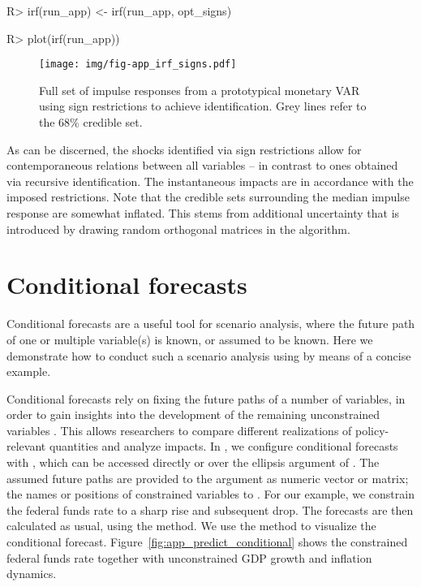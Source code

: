 \documentclass[article,nojss]{jss} %
\begin{document}
\begin{appendix}
\begin{Schunk}
\begin{Sinput}
R> irf(run_app) <- irf(run_app, opt_signs)
\end{Sinput}
\end{Schunk}
\begin{Schunk}
\begin{Sinput}
R> plot(irf(run_app))
\end{Sinput}
\end{Schunk}

\begin{figure}[ht!]
	\centering
  \texttt{[image: img/fig-app\_irf\_signs.pdf]}
	\caption{Full set of impulse responses from a prototypical monetary VAR using sign restrictions to achieve identification. Grey lines refer to the 68\% credible set.}
	\label{fig:app_irf_signs}
\end{figure}

As can be discerned, the shocks identified via sign restrictions allow for contemporaneous relations between all variables -- in contrast to ones obtained via recursive identification.
The instantaneous impacts are in accordance with the imposed restrictions. Note that the credible sets surrounding the median impulse response are somewhat inflated. This stems from additional uncertainty that is introduced by drawing random orthogonal matrices in the algorithm.


\section{Conditional forecasts}\label{app:cond}

Conditional forecasts are a useful tool for scenario analysis, where the future path of one or multiple variable(s) is known, or assumed to be known. Here we demonstrate how to conduct such a scenario analysis using  by means of a concise example.

Conditional forecasts rely on fixing the future paths of a number of variables, in order to gain insights into the development of the remaining unconstrained variables \citep{waggoner1999}. This allows researchers to compare different realizations of policy-relevant quantities and analyze impacts.
In , we configure conditional forecasts with , which can be accessed directly or over the ellipsis argument of . The assumed future paths are provided to the  argument as numeric vector or matrix; the names or positions of constrained variables to . For our example, we constrain the federal funds rate to a sharp rise and subsequent drop. The forecasts are then calculated as usual, using the  method.
We use the  method to visualize the conditional forecast. Figure~\ref{fig:app_predict_conditional} shows the constrained federal funds rate together with unconstrained GDP growth and inflation dynamics.


\end{appendix}
\end{document}
